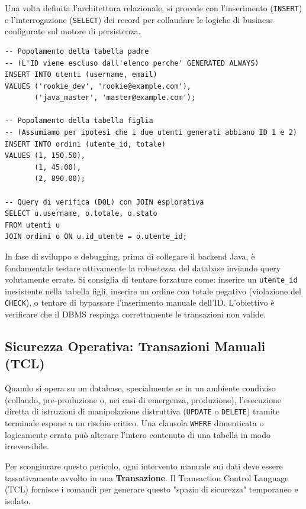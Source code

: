 Una volta definita l'architettura relazionale, si procede con l'inserimento (\texttt{INSERT}) e l'interrogazione (\texttt{SELECT}) dei record per collaudare le logiche di business configurate sul motore di persistenza.

\begin{lstlisting}[language=PostgreSQL, title=DML: Inserimento e Interrogazione]
-- Popolamento della tabella padre 
-- (L'ID viene escluso dall'elenco perche' GENERATED ALWAYS)
INSERT INTO utenti (username, email)
VALUES ('rookie_dev', 'rookie@example.com'),
       ('java_master', 'master@example.com');

-- Popolamento della tabella figlia
-- (Assumiamo per ipotesi che i due utenti generati abbiano ID 1 e 2)
INSERT INTO ordini (utente_id, totale)
VALUES (1, 150.50),
       (1, 45.00),
       (2, 890.00);

-- Query di verifica (DQL) con JOIN esplorativa
SELECT u.username, o.totale, o.stato
FROM utenti u
JOIN ordini o ON u.id_utente = o.utente_id;
\end{lstlisting}

\begin{warningbox}
In fase di sviluppo e debugging, prima di collegare il backend Java, è fondamentale testare attivamente la robustezza del database inviando query volutamente errate. Si consiglia di tentare forzature come: inserire un \texttt{utente\_id} inesistente nella tabella figli, inserire un ordine con totale negativo (violazione del \texttt{CHECK}), o tentare di bypassare l'inserimento manuale dell'ID. L'obiettivo è verificare che il DBMS respinga correttamente le transazioni non valide.
\end{warningbox}

\subsection{Sicurezza Operativa: Transazioni Manuali (TCL)}

Quando si opera su un database, specialmente se in un ambiente condiviso (collaudo, pre-produzione o, nei casi di emergenza, produzione), l'esecuzione diretta di istruzioni di manipolazione distruttiva (\texttt{UPDATE} o \texttt{DELETE}) tramite terminale espone a un rischio critico. Una clausola \texttt{WHERE} dimenticata o logicamente errata può alterare l'intero contenuto di una tabella in modo irreversibile.

Per scongiurare questo pericolo, ogni intervento manuale sui dati deve essere tassativamente avvolto in una \textbf{Transazione}. Il Transaction Control Language (TCL) fornisce i comandi per generare questo "spazio di sicurezza" temporaneo e isolato.

